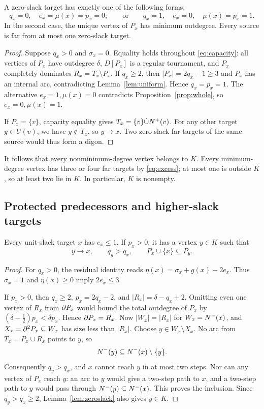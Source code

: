 \begin{lemma}\label{lem:zeroslack}
A zero-slack target has exactly one of the following forms:
\[
q_x=0,\quad e_x=\mu(x)=p_x=0;
\qquad\text{or}\qquad
q_x=1,\quad e_x=0,\quad \mu(x)=p_x=1.
\]
In the second case, the unique vertex of $P_x$ has minimum outdegree.
Every source is far from at most one zero-slack target.
\end{lemma}
\begin{proof}
Suppose $q_x>0$ and $\sigma_x=0$. Equality holds throughout
\eqref{eq:capacity}: all vertices of $P_x$ have outdegree $\delta$,
$D[P_x]$ is a regular tournament, and $P_x$ completely dominates
$R_x=T_x\setminus P_x$.
If $q_x\ge2$, then $|P_x|=2q_x-1\ge3$ and $P_x$ has an internal arc,
contradicting Lemma~\ref{lem:uniform}.
Hence $q_x=p_x=1$. The alternative $e_x=1,\mu(x)=0$ contradicts
Proposition~\ref{prop:whole}, so $e_x=0,\mu(x)=1$.

If $P_x=\{v\}$, capacity equality gives
$T_x=\{v\}\dot\cup N^+(v)$.
For any other target $y\in U(v)$, we have $y\notin T_x$, so $y\to x$.
Two zero-slack far targets of the same source would thus form a digon.
\end{proof}

It follows that every nonminimum-degree vertex belongs to $K$.
Every minimum-degree vertex has three or four far targets by
\eqref{eq:excess}; at most one is outside $K$, so at least two lie in $K$.
In particular, $K$ is nonempty.

\subsection{Protected predecessors and higher-slack targets}

\begin{lemma}\label{lem:parent}
Every unit-slack target $x$ has $e_x\le1$. If $p_x>0$, it has a
vertex $y\in K$ such that
\[
y\to x,\qquad q_y>q_x,\qquad P_x\cup\{x\}\subseteq P_y.
\]
\end{lemma}
\begin{proof}
For $q_x>0$, the residual identity reads
$\eta(x)=\sigma_x+g(x)-2e_x$.
Thus $\sigma_x=1$ and $\eta(x)\ge0$ imply $2e_x\le3$.

If $p_x>0$, then $q_x\ge2$, $p_x=2q_x-2$, and
$|R_x|=\delta-q_x+2$. Omitting even one vertex of $R_x$ from
$\partial P_x$ would bound the total outdegree of $P_x$ by
$(\delta-\tfrac12)p_x<\delta p_x$. Hence $\partial P_x=R_x$.
Now $|W_x|=|R_x|$ for $W_x=N^-(x)$, and
$X_x=\partial^2P_x\subseteq W_x$ has size less than $|R_x|$.
Choose $y\in W_x\setminus X_x$. No arc from $T_x=P_x\cup R_x$
points to $y$, so
\[
N^-(y)\subseteq N^-(x)\setminus\{y\}.
\]
Consequently $q_y>q_x$, and $x$ cannot reach $y$ in at most two steps.
Nor can any vertex of $P_x$ reach $y$: an arc to $y$ would give a
two-step path to $x$, and a two-step path to $y$ would pass through
$N^-(y)\subseteq N^-(x)$.
This proves the inclusion. Since $q_y>q_x\ge2$,
Lemma~\ref{lem:zeroslack} also gives $y\in K$.
\end{proof}

